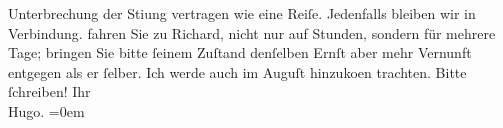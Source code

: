 \begin{ledgroupsized}[t]{13cm}
                    Unterbrechung der Sti{\geminationm}ung vertragen wie eine
                    Reiſe.\pend
           \pstart
           Jedenfalls bleiben wir in Verbindung. 
                    fahren Sie zu Richard, nicht nur auf
                    Stunden, sondern für mehrere Tage; bringen Sie bitte ſeinem Zuſtand denſelben
                    Ernſt aber mehr {\pb}Vernunft
                    entgegen als er ſelber. Ich werde auch im Auguſt hinzuko{\geminationm}en trachten.\pend
           \pstart
           Bitte ſchreiben!\pend
           \pstart
           Ihr{\\[\baselineskip]}\spacefill\mbox{Hugo.}\pend
           \leftskip=0em{}
         
         \endnumbering{}\end{ledgroupsized}  \newcommand{\dateiname}{L00944}\newcommand{\titel}{Hugo von Hofmannsthal an Arthur Schnitzler, 15. 7. [1899]}\newcommand{\editorInnen}{Martin Anton Müller und Gerd-Hermann Susen}
      